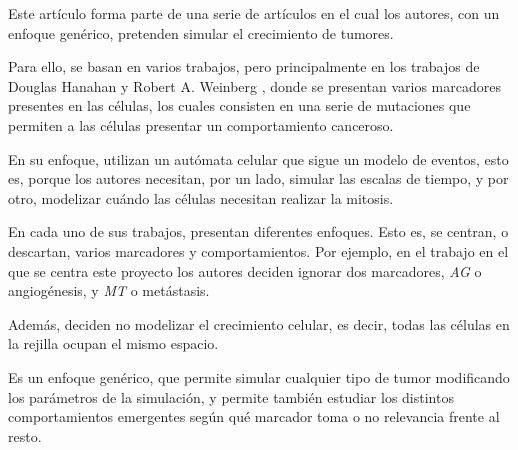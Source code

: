 Este artículo \cite{jsantos-amonteagudo-1-2014} forma parte de una serie de artículos
\cite{jsantos-amonteagudo-2012} \cite{jsantos-amonteagudo-2013} \cite{jsantos-amonteagudo-2015}
en el cual los autores, con un enfoque genérico, pretenden simular el crecimiento de
tumores.

Para ello, se basan en varios trabajos, pero principalmente en los trabajos de Douglas Hanahan y Robert A. Weinberg
\cite{hanahan-weinberg-2000} \cite{hanahan-weinberg-2011}, donde se presentan varios marcadores presentes
en las células, los cuales consisten en una serie de mutaciones que permiten a las células presentar
un comportamiento canceroso.

En su enfoque, utilizan un autómata celular que sigue un modelo de eventos, esto es, porque los autores
necesitan, por un lado, simular las escalas de tiempo, y por otro, modelizar cuándo las células necesitan
realizar la mitosis.

En cada uno de sus trabajos, presentan diferentes enfoques. Esto es, se centran, o descartan, varios marcadores y
comportamientos. Por ejemplo, en el trabajo en el que se centra este proyecto \cite{jsantos-amonteagudo-1-2014}
los autores deciden ignorar dos marcadores, \textit{AG} o angiogénesis, y \textit{MT} o metástasis.

Además, deciden no modelizar el crecimiento celular, es decir, todas las células en la rejilla ocupan
el mismo espacio.

Es un enfoque genérico, que permite simular cualquier tipo de tumor modificando los parámetros de la
simulación, y permite también estudiar los distintos comportamientos emergentes según
qué marcador toma o no relevancia frente al resto.
